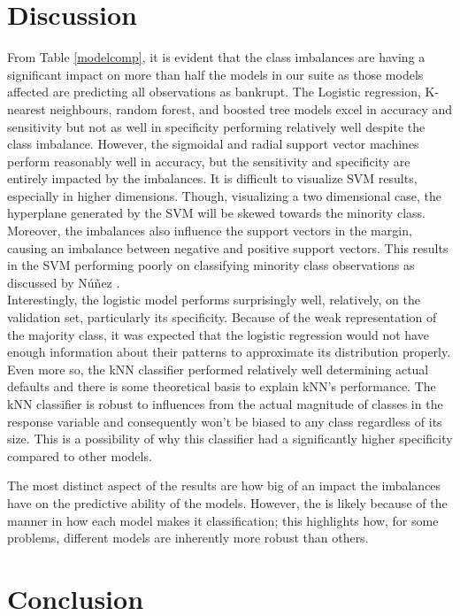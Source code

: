 \documentclass[12pt]{report}
\begin{document}
\section{Discussion}

From Table \ref{modelcomp}, it is evident that the class imbalances are having a significant impact on more than half the models in our suite as those models affected are predicting all observations as bankrupt. The Logistic regression, K-nearest neighbours, random forest, and boosted tree models excel in accuracy and sensitivity but not as well in specificity performing relatively well despite the class imbalance. However, the sigmoidal and radial support vector machines perform reasonably well in accuracy, but the sensitivity and specificity are entirely impacted by the imbalances. It is difficult to visualize SVM results, especially in higher dimensions. Though, visualizing a two dimensional case, the hyperplane generated by the SVM will be skewed towards the minority class. Moreover, the imbalances also influence the support vectors in the margin, causing an imbalance between negative and positive support vectors. This results in the SVM performing poorly on classifying minority class observations as discussed by Núñez \cite{SVM}. \\
\indent Interestingly, the logistic model performs surprisingly well, relatively, on the validation set, particularly its specificity. Because of the weak representation of the majority class, it was expected that the logistic regression would not have enough information about their patterns to approximate its distribution properly. Even more so, the kNN classifier performed relatively well determining actual defaults and there is some theoretical basis to explain kNN's performance. The kNN classifier is robust to influences from the actual magnitude of classes in the response variable and consequently won't be biased to any class regardless of its size. This is a possibility of why this classifier had a significantly higher specificity compared to other models.  

The most distinct aspect of the results are how big of an impact the imbalances have on the predictive ability of the models. However, the is likely because of the manner in how each model makes it classification; this highlights how, for some problems, different models are inherently more robust than others. 

\section{Conclusion}
\end{document}
